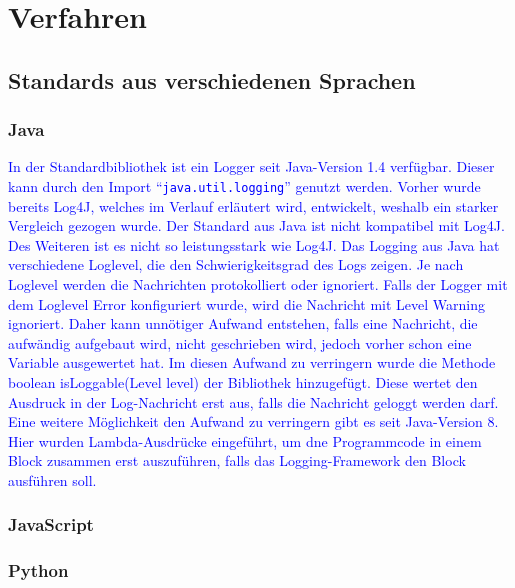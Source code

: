 \chapter{Verfahren}\label{ch:verfahren}


\section{Standards aus verschiedenen Sprachen}\label{sec:standards-aus-verschiedenen-sprachen}

\subsection{Java}\label{subsec:java}
\textcolor{blue}{
    In der Standardbibliothek ist ein Logger seit Java-Version 1.4 verfügbar.
    Dieser kann durch den Import \enquote{\texttt{java.util.logging}} genutzt werden.
    Vorher wurde bereits Log4J, welches im Verlauf erläutert wird, entwickelt, weshalb ein starker Vergleich gezogen wurde.
    Der Standard aus Java ist nicht kompatibel mit Log4J.
    Des Weiteren ist es nicht so leistungsstark wie Log4J.
    Das Logging aus Java hat verschiedene Loglevel, die den Schwierigkeitsgrad des Logs zeigen.
    Je nach Loglevel werden die Nachrichten protokolliert oder ignoriert.
    Falls der Logger mit dem Loglevel Error konfiguriert wurde, wird die Nachricht mit Level Warning ignoriert.
    Daher kann unnötiger Aufwand entstehen, falls eine Nachricht, die aufwändig aufgebaut wird, nicht geschrieben wird, jedoch vorher schon eine Variable ausgewertet hat.
    Im diesen Aufwand zu verringern wurde die Methode boolean isLoggable(Level level) der Bibliothek hinzugefügt.
    Diese wertet den Ausdruck in der Log-Nachricht erst aus, falls die Nachricht geloggt werden darf.
    Eine weitere Möglichkeit den Aufwand zu verringern gibt es seit Java-Version 8.
    Hier wurden Lambda-Ausdrücke eingeführt, um dne Programmcode in einem Block zusammen erst auszuführen, falls das Logging-Framework den Block ausführen soll.
}\autocite{rheinwerk, baeldung}

\subsection{JavaScript}\label{subsec:javascript}

\subsection{Python}\label{subsec:python}

